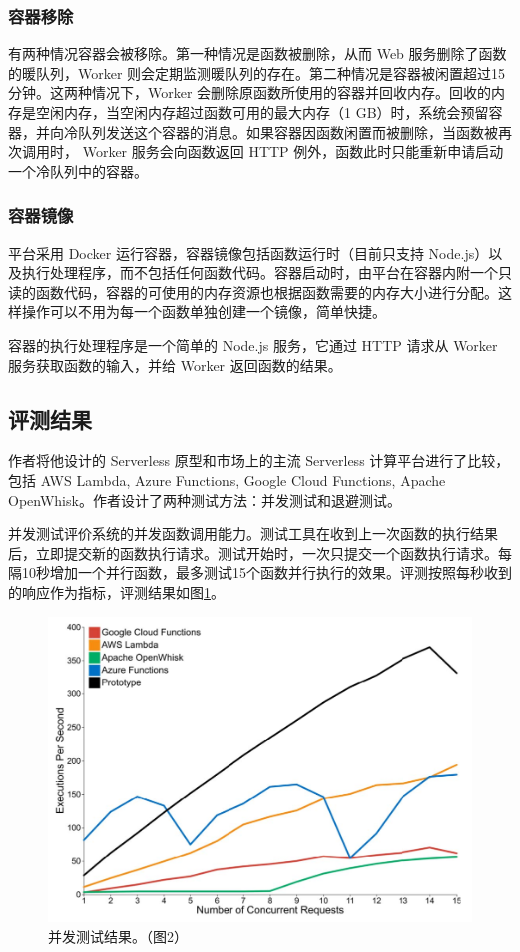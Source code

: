 \documentclass[11pt]{article}
\begin{document}
\subsubsection{容器移除}
有两种情况容器会被移除。第一种情况是函数被删除，从而 Web 服务删除了函数的暖队列，Worker 则会定期监测暖队列的存在。第二种情况是容器被闲置超过15分钟。这两种情况下，Worker 会删除原函数所使用的容器并回收内存。回收的内存是空闲内存，当空闲内存超过函数可用的最大内存（1 GB）时，系统会预留容器，并向冷队列发送这个容器的消息。如果容器因函数闲置而被删除，当函数被再次调用时， Worker 服务会向函数返回 HTTP 例外，函数此时只能重新申请启动一个冷队列中的容器。

\subsubsection{容器镜像}
平台采用 Docker 运行容器，容器镜像包括函数运行时（目前只支持 Node.js）以及执行处理程序，而不包括任何函数代码。容器启动时，由平台在容器内附一个只读的函数代码，容器的可使用的内存资源也根据函数需要的内存大小进行分配。这样操作可以不用为每一个函数单独创建一个镜像，简单快捷。


容器的执行处理程序是一个简单的 Node.js 服务，它通过 HTTP 请求从 Worker 服务获取函数的输入，并给 Worker 返回函数的结果。

\subsection{评测结果}
作者将他设计的 Serverless 原型和市场上的主流 Serverless 计算平台进行了比较，包括 AWS Lambda, Azure Functions, Google Cloud Functions, Apache OpenWhisk。作者设计了两种测试方法：并发测试和退避测试。


并发测试评价系统的并发函数调用能力。测试工具在收到上一次函数的执行结果后，立即提交新的函数执行请求。测试开始时，一次只提交一个函数执行请求。每隔10秒增加一个并行函数，最多测试15个函数并行执行的效果。评测按照每秒收到的响应作为指标，评测结果如图\ref{figs:2017_concuttent_test}。
\begin{figure}[!htbp]
	\centering
	\includegraphics[width=0.8\linewidth]{figs/2017_concuttent_test}
	\caption{并发测试结果。（\cite{mcgrath2017serverless}图2）}
	\label{figs:2017_concuttent_test}
\end{figure}
\end{document}
